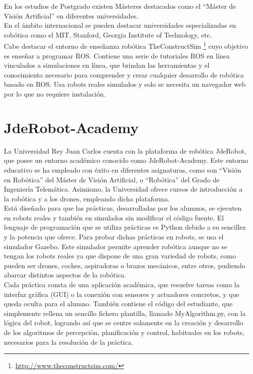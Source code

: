En los estudios de Postgrado existen Másteres destacados como el ``Máster de Visión Artificial'' en diferentes universidades. \\

En el ámbito internacional se pueden destacar universidades especializadas en robótica como el MIT, Stanford, Georgia Institute of Technology, etc. \\

Cabe destacar el entorno de enseñanza robótica TheConstructSim \footnote{\url{http://www.theconstructsim.com/}} cuyo objetivo es enseñar a programar ROS.  Contiene una serie de tutoriales ROS en línea vinculados a simulaciones en línea, que brindan las herramientas y el conocimiento necesario para comprender y crear cualquier desarrollo de robótica basado en ROS. Usa robots reales simulados y solo se necesita un navegador web por lo que no requiere instalación.


\section{JdeRobot-Academy}
La Universidad Rey Juan Carlos cuenta con la plataforma de robótica JdeRobot, que posee un entorno académico conocido como JdeRobot-Academy. Este entorno educativo se ha empleado con éxito en diferentes asignaturas, como son ``Visión en Robótica'' del Máster de Visión Artificial, o ``Robótica'' del Grado de Ingeniería Telemática. Asimismo, la Universidad ofrece cursos de introducción a la robótica y a los drones, empleando dicha plataforma. \\

Está diseñado para que las prácticas, desarrolladas por los alumnos, se ejecuten en robots reales y también en simulados sin modificar el código fuente. El lenguaje de programación que se utiliza prácticas es Python debido a su sencillez y la potencia que ofrece. Para probar dichas prácticas en robots, se usa el simulador Gazebo. Este simulador permite aprender robótica aunque no se tengan los robots reales ya que dispone de una gran variedad de robots, como pueden ser drones, coches, aspiradoras o brazos mecánicos, entre otros, pudiendo abarcar distintos aspectos de la robótica. \\

Cada práctica consta de una aplicación académica, que resuelve tareas como la interfaz gráfica (GUI) o la conexión con sensores y actuadores concretos, y que queda oculta para el alumno. También contiene el código del estudiante, que simplemente rellena un sencillo fichero plantilla, llamado MyAlgorithm.py, con la lógica del robot, logrando así que se centre solamente en la creación y desarrollo de los algoritmos de percepción, planificación y control, habituales en los robots, necesarios para la resolución de la práctica. \\

